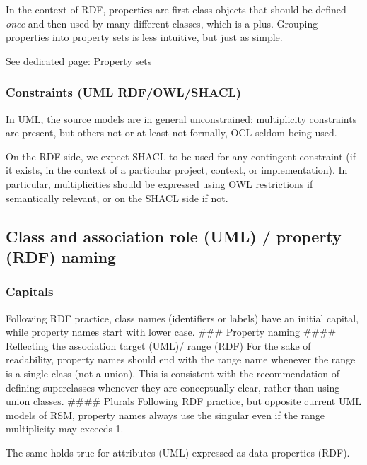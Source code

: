 \documentclass[
  11pt,
]{article}
\begin{document}
In the context of RDF, properties are first class objects that should be
defined \emph{once} and then used by many different classes, which is a
plus. Grouping properties into property sets is less intuitive, but just
as simple.

See dedicated page: \protect\hyperlink{sets}{Property sets}

\hypertarget{constraints-uml-rdfowlshacl}{%
\subsubsection{Constraints (UML
RDF/OWL/SHACL)}\label{constraints-uml-rdfowlshacl}}

In UML, the source models are in general unconstrained: multiplicity
constraints are present, but others not or at least not formally, OCL
seldom being used.

On the RDF side, we expect SHACL to be used for any contingent
constraint (if it exists, in the context of a particular project,
context, or implementation). In particular, multiplicities should be
expressed using OWL restrictions if semantically relevant, or on the
SHACL side if not.

\hypertarget{class-and-association-role-uml-property-rdf-naming}{%
\subsection{Class and association role (UML) / property (RDF)
naming}\label{class-and-association-role-uml-property-rdf-naming}}

\hypertarget{capitals}{%
\subsubsection{Capitals}\label{capitals}}

Following RDF practice, class names (identifiers or labels) have an
initial capital, while property names start with lower case. \#\#\#
Property naming \#\#\#\# Reflecting the association target (UML)/ range
(RDF) For the sake of readability, property names should end with the
range name whenever the range is a single class (not a union). This is
consistent with the recommendation of defining superclasses whenever
they are conceptually clear, rather than using union classes. \#\#\#\#
Plurals Following RDF practice, but opposite current UML models of RSM,
property names always use the singular even if the range multiplicity
may exceeds 1.

The same holds true for attributes (UML) expressed as data properties
(RDF).
\end{document}
